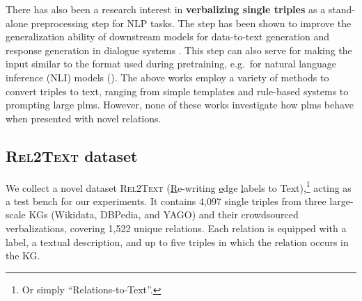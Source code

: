 There has also been a research interest in \textbf{verbalizing single triples} as a stand-alone preprocessing step for NLP tasks. The step has been shown to improve the generalization ability of downstream models for data-to-text generation \cite{laha2020scalable,kasner2020data,kasner2022neural,xiang2022asdot} and response generation in dialogue systems \cite{kale-rastogi-2020-template}. This step can also serve for making the input similar to the format used during pretraining, e.g.\ for  natural language inference (NLI) models (\citealp{gupta2020infotabs,neeraja2021incorporating,duvsek2020evaluating}). The above works employ a variety of methods to convert triples to text, ranging from simple templates and rule-based systems to prompting large \acp{plm}. However, none of these works investigate how \acp{plm} behave when presented with novel relations.


% 









\subsection{\textsc{Rel2Text} dataset}
\label{sec:rel2text:data}
We collect a novel dataset \textsc{Rel2Text} (\underline{R}e-writing \underline{e}dge \underline{l}abels to Text),\footnote{Or simply ``Relations-to-Text''.} acting as a test bench for our experiments. It contains 4,097 single triples from three large-scale KGs (Wikidata, \mbox{DBPedia}, and YAGO) and their crowdsourced verbalizations, covering 1,522 unique relations. Each relation is equipped with a label, a textual description, and up to five triples in which the relation occurs in the KG.

